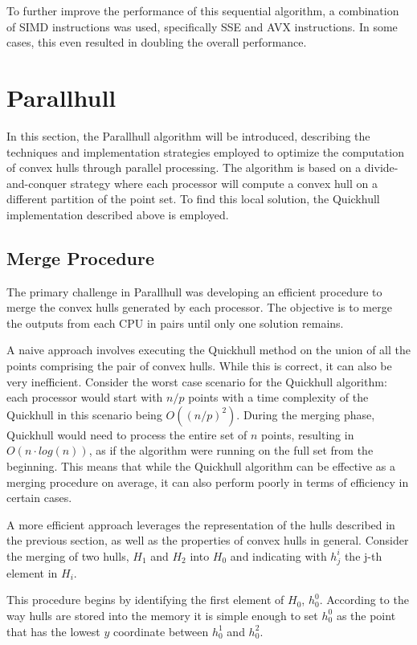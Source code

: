 \documentclass[a4paper]{article}
\begin{document}
To further improve the performance of this sequential algorithm, a combination of SIMD instructions was used, specifically SSE and AVX instructions.
In some cases, this even resulted in doubling the overall performance.

\section{Parallhull}

In this section, the Parallhull algorithm will be introduced, describing the techniques and implementation strategies employed to optimize the computation of convex hulls through parallel processing.
The algorithm is based on a divide-and-conquer strategy where each processor will compute a convex hull on a different partition of the point set.
To find this local solution, the Quickhull implementation described above is employed.

\subsection{Merge Procedure}

The primary challenge in Parallhull was developing an efficient procedure to merge the convex hulls generated by each processor.
The objective is to merge the outputs from each CPU in pairs until only one solution remains.

A naive approach involves executing the Quickhull method on the union of all the points comprising the pair of convex hulls.
While this is correct, it can also be very inefficient.
Consider the worst case scenario for the Quickhull algorithm: each processor would start with $n/p$ points with a time complexity of the Quickhull in this scenario being $O((n/p)^2)$.
During the merging phase, Quickhull would need to process the entire set of $n$ points, resulting in $O(n\cdot log(n))$, as if the algorithm were running on the full set from the beginning.
This means that while the Quickhull algorithm can be effective as a merging procedure on average, it can also perform poorly in terms of efficiency in certain cases.

A more efficient approach leverages the representation of the hulls described in the previous section, as well as the properties of convex hulls in general.
Consider the merging of two hulls, $H_1$ and $H_2$ into $H_0$ and indicating with $h^i_j$ the j-th element in $H_i$.

This procedure begins by identifying the first element of $H_0$, $h^0_0$.
According to the way hulls are stored into the memory it is simple enough to set $h^0_0$ as the point that has the lowest $y$ coordinate between $h^1_0$ and $h^2_0$.
\end{document}
